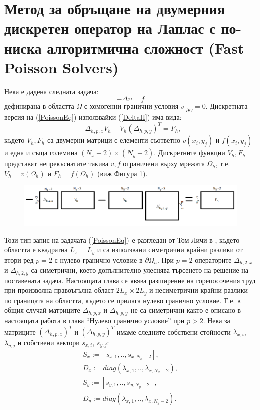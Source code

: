 \documentclass{article}
\newcommand{\be}{\begin{equation}}
\newcommand{\ee}{\end{equation}}
\newcommand{\rf}[1]{(\ref{#1})}
\begin{document}
\section{Метод за обръщане на двумерния дискретен оператор на Лаплас с по-ниска алгоритмична сложност (Fast Poisson Solvers) }
Нека е дадена следната задача:
\be\label{PoissonEq}
-\Delta v = f
\ee
дефинирана в областта $\Omega$ с хомогенни гранични условия $v \big|_{\partial\Omega} = 0$. Дискретната версия на \rf{PoissonEq} използвайки \rf{DeltaH} има вида:
\be\label{PsnDiscret}
-\Delta_{h,p,x}  V_h - V_h (\Delta_{h,p,y})^T = F_h,
\ee
където $V_h, F_h$ са двумерни матрици с елементи съответно $v(x_i,y_j)$ и  $f(x_i,y_j)$ и една и съща големина $(N_x-2)\times(N_y-2)$. Дискретните функции $V_h, F_h$ представят непрекъснатите такива $v, f$ ограничени върху мрежата $\Omega_h$, т.е. $V_h = v(\Omega_h)$ и $F_h = f(\Omega_h)$ (виж Фигура \ref{fig:FPSexplained}).
\begin{figure}[ht]
     \includegraphics[width=\linewidth]{FPSExplained.png}
	\caption{}
	\label{fig:FPSexplained}
\end{figure}
\FloatBarrier
Този тип запис на задачата \rf{PoissonEq} е разгледан от Том Личи в \cite{ref34}, където областта е квадратна $L_x = L_y$ и са използвани симетрични крайни разлики от втори ред $p=2$ с нулево гранично условие в $\partial \Omega_h$. При $p=2$ операторите $\Delta_{h,2,x}$ и $\Delta_{h,2,y}$ са симетрични, което допълнително улеснява търсенето на решение на поставената задача. Настоящата глава се явява разширение на горепосочения труд при произволна правоъгълна област $2L_x \times 2L_y$ и несиметрични крайни разлики по границата на областта, където се прилага нулево гранично условие. Т.е. в общия случай матриците $\Delta_{h,p,x}$ и $\Delta_{h,p,y}$ не са симетрични както е описано в настоящата работа в глава ``Нулево гранично условие'' при $p>2$. Нека за матриците $(\Delta_{h,p,x})^T$ и $(\Delta_{h,p,y})^T$ имаме следните собствени стойности $\lambda_{x,i}$, $\lambda_{y,j}$ и собствени вектори $s_{x,i}$, $s_{y,j}$:
\begin{align}
S_x:=[s_{x,1},..,s_{x,N_x-2}],\\
D_x:= diag(\lambda_{x,1},..,\lambda_{x,N_x-2}),\\
S_y:=[s_{y,1},..,s_{y,N_y-2}],\\
D_y:= diag(\lambda_{x,1},..,\lambda_{x,N_y-2}).
\end{align}
\end{document}
